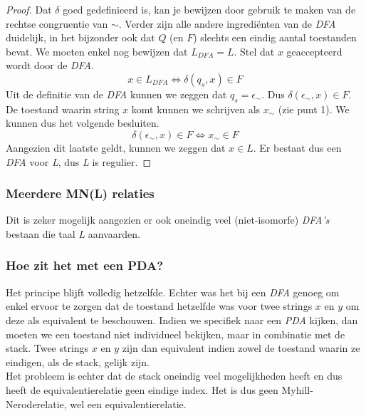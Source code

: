 \begin{proof}
  Dat $\delta$ goed gedefinieerd is, kan je bewijzen door gebruik te maken van de rechtse congruentie van $\sim$. Verder zijn alle andere ingredi\"enten van de \emph{DFA} duidelijk, in het bijzonder ook dat $Q$ (en $F$) slechts een eindig aantal toestanden bevat. We moeten enkel nog bewijzen dat $L_{DFA} = L$. Stel dat $x$ geaccepteerd wordt door de \emph{DFA}.
  $$x \in L_{DFA} \iff \delta(q_s, x) \in F$$
  Uit de definitie van de \emph{DFA} kunnen we zeggen dat $q_s = \epsilon_{\sim}$. Dus $\delta(\epsilon_{\sim},x) \in F$. De toestand waarin string $x$ komt kunnen we schrijven als $x_{\sim}$ (zie punt 1). We kunnen dus het volgende besluiten.
  $$\delta(\epsilon_{\sim},x) \in F \iff x_{\sim} \in F$$
  Aangezien dit laatste geldt, kunnen we zeggen dat $x \in L$. Er bestaat dus een \emph{DFA} voor \emph{L}, dus \emph{L} is regulier.
\end{proof}

\subsubsection*{Meerdere MN(L) relaties}

Dit is zeker mogelijk aangezien er ook oneindig veel (niet-isomorfe) \emph{DFA's} bestaan die taal \emph{L} aanvaarden.

\subsubsection*{Hoe zit het met een PDA?}

Het principe blijft volledig hetzelfde. Echter was het bij een \emph{DFA} genoeg om enkel ervoor te zorgen dat de toestand hetzelfde was voor twee strings $x$ en $y$ om deze als equivalent te beschouwen. Indien we specifiek naar een \emph{PDA} kijken, dan moeten we een toestand niet individueel bekijken, maar in combinatie met de stack. Twee strings $x$ en $y$ zijn dan equivalent indien zowel de toestand waarin ze eindigen, als de stack, gelijk zijn.\\

Het probleem is echter dat de stack oneindig veel mogelijkheden heeft en dus heeft de equivalentierelatie geen eindige index. Het is dus geen Myhill-Neroderelatie, wel een equivalentierelatie.
